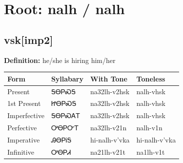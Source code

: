 \documentclass{article}%
\begin{document}
%
\normalsize%
\section*{Root: nalh / nalh}%
\subsection*{vsk[imp2]}%
\textbf{Definition: }%
he/she is hiring him/her%
\\[0.5em]%
\begin{tabular}{|l|l|l|l|}%
\hline%
\textbf{Form}&\textbf{Syllabary}&\textbf{With Tone}&\textbf{Toneless}\\%
\hline%
Present&ᎦᎾᏢᏍᎦ&na32lh{-}v2hsk&nalh{-}vhsk\\%
1st Present&ᏥᎾᏢᏍᎦ&na32lh{-}v2hsk&nalh{-}vhsk\\%
Imperfective&ᎦᎾᏢᏍᎪᎢ&na32lh{-}v2hsk&nalh{-}vhsk\\%
Perfective&ᎤᎾᏢᏅᎢ&na32lh{-}v21n&nalh{-}v1n\\%
Imperative&ᎯᎾᏢᎥᎦ&hi{-}nalh{-}v'vka&hi{-}nalh{-}v'vka\\%
Infinitive&ᎤᎾᏢᏗ&na21lh{-}v21t&na1lh{-}v1t\\%
\hline%
\end{tabular}%
\\[1em]%
\end{document}
